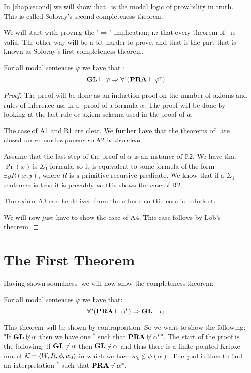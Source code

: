 \documentclass[../main.tex]{subfiles}
\begin{document}
In \ref{chap:second} we will show that \GLS\ is the modal logic of provability
in truth. This is called Solovay's second completeness theorem.

We will start with proving the "$\Rightarrow$" implication; i.e that every
theorem of \GL\ is \PRA-valid. The other way will be a bit harder to prove, and
that is the part that is known as Solovay's first completeness theorem.
\begin{thm}[Soundness]
	For all modal sentences $\varphi$ we have that :
	$$\text{\textbf{GL}}\vdash\varphi\Rightarrow\forall ^*(\text{\textbf{PRA}}\vdash\varphi^*)$$
\end{thm}
\begin{proof}
	The proof will be done as an induction proof on the number of axioms
	and rules of inference use in a \GL-proof of a formula $\alpha$. The
	proof will be done by looking at the last rule or axiom schema used in
	the proof of $\alpha$.

	The case of A1 and R1 are clear. We further have that the theorems of
	\PRA\ are closed under modus ponens so A2 is also clear. 

	Assume that  the last step of the proof of $\alpha$ is an instance of
	R2. We have that $\Pr(x)$ is $\Sigma_1$ formula, so it is equivalent to
	some formula of the form $\exists y R(x,y)$, where $R$ is a primitive
	recursive predicate. We know that if a $\Sigma_1$ sentences is true it
	is provably, so this shows the case of R2.

	The axiom A3 can be derived from the others, so this case is redudant.

	We will now just have to show the case of A4. This case follows by
	Löb's theorem.
\end{proof}
\section{The First Theorem}
Having shown soundness, we will now show the completeness theorem:
\begin{thm}
	For all modal sentences $\varphi$ we have that:
	$$\forall ^* (\text{\textbf{PRA}}\vdash \alpha^*)\Rightarrow \text{\textbf{GL}}\vdash \alpha$$
\end{thm}

This theorem will be shown by contraposition. So we want to show the following:
"If $\text{\textbf{GL}}\not\vdash \alpha$ then we
have one $^*$ such that $\text{\textbf{PRA}}\not\vdash\alpha^*$". 
The start of the proof is the following: If $\text{\textbf{GL}}\not\vdash\alpha$ then
$\text{\textbf{GL}}\not\vDash\alpha$ and thus there is a finite pointed Kripke model $\mathcal{K}=\langle
W,R,\phi,w_0\rangle$ in which we have $w_0\not\in\phi(\alpha)$. The goal is then to
find an interpretation $^*$ such that $\text{\textbf{PRA}}\not\vdash\alpha^*$.
\end{document}
